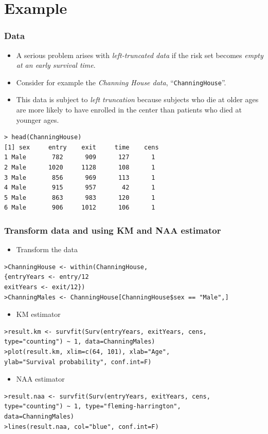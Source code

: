 \documentclass{beamer}
\newcommand{\empr}[1]{{\emph{\color{red}#1}}}
\begin{document}
\section{Example}
\begin{frame}[fragile]
\frametitle{Data}
\begin{itemize}
\item A serious problem arises with \empr{left-truncated data} if the risk set becomes \empr{empty at an early survival time}.
\item Consider for example the \empr{Channing House data}, ``\texttt{ChanningHouse}''. 
\item This data is subject to \empr{left truncation} because subjects who die at {\color{red}older ages} are {\color{red}more likely} to have enrolled in the center than patients who died at {\color{red}younger ages}.
\end{itemize}

\begin{Verbatim}
> head(ChanningHouse)
[1] sex     entry    exit     time    cens
1 Male       782      909      127      1
2 Male      1020     1128      108      1
3 Male       856      969      113      1
4 Male       915      957       42      1
5 Male       863      983      120      1
6 Male       906     1012      106      1
\end{Verbatim}
\end{frame}

\pagebreak
\begin{frame}[fragile]
\frametitle{Transform data and using KM and NAA estimator}
\begin{itemize}
\item Transform the data 
\end{itemize}
\begin{Verbatim}
>ChanningHouse <- within(ChanningHouse, 
{entryYears <- entry/12 
exitYears <- exit/12})
>ChanningMales <- ChanningHouse[ChanningHouse$sex == "Male",]
\end{Verbatim}
\begin{itemize}
\item {\color{red}KM estimator}
\end{itemize}
\begin{Verbatim}
>result.km <- survfit(Surv(entryYears, exitYears, cens, 
type="counting") ~ 1, data=ChanningMales)
>plot(result.km, xlim=c(64, 101), xlab="Age",
ylab="Survival probability", conf.int=F)
\end{Verbatim}
\begin{itemize}
\item {\color{red}NAA estimator}
\end{itemize}
\begin{Verbatim}
>result.naa <- survfit(Surv(entryYears, exitYears, cens,
type="counting") ~ 1, type="fleming-harrington",
data=ChanningMales)
>lines(result.naa, col="blue", conf.int=F)
\end{Verbatim}
\end{frame}
\end{document}
